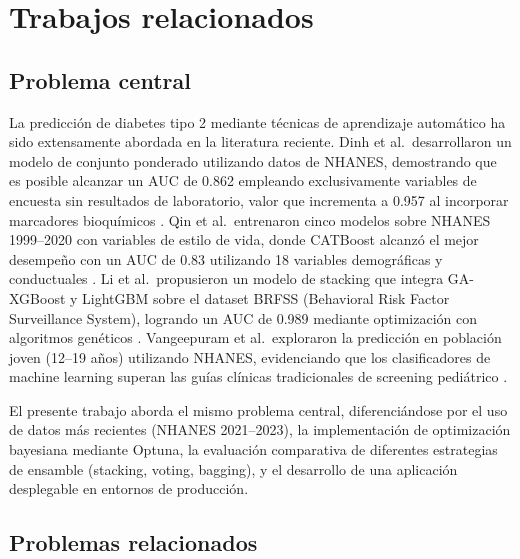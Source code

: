 \documentclass[12pt, a4paper]{report}
\begin{document}

\chapter{Trabajos relacionados}

\section{Problema central}

La predicción de diabetes tipo 2 mediante técnicas de aprendizaje automático ha sido extensamente abordada en la literatura reciente. Dinh et al.\ desarrollaron un modelo de conjunto ponderado utilizando datos de NHANES, demostrando que es posible alcanzar un AUC de 0.862 empleando exclusivamente variables de encuesta sin resultados de laboratorio, valor que incrementa a 0.957 al incorporar marcadores bioquímicos \citep{dinh2019data}. Qin et al.\ entrenaron cinco modelos sobre NHANES 1999--2020 con variables de estilo de vida, donde CATBoost alcanzó el mejor desempeño con un AUC de 0.83 utilizando 18 variables demográficas y conductuales \citep{qin2022machine}. Li et al.\ propusieron un modelo de stacking que integra GA-XGBoost y LightGBM sobre el dataset BRFSS (Behavioral Risk Factor Surveillance System), logrando un AUC de 0.989 mediante optimización con algoritmos genéticos \citep{li2024diabetes}. Vangeepuram et al.\ exploraron la predicción en población joven (12--19 años) utilizando NHANES, evidenciando que los clasificadores de machine learning superan las guías clínicas tradicionales de screening pediátrico \citep{vangeepuram2021predicting}.

El presente trabajo aborda el mismo problema central, diferenciándose por el uso de datos más recientes (NHANES 2021--2023), la implementación de optimización bayesiana mediante Optuna, la evaluación comparativa de diferentes estrategias de ensamble (stacking, voting, bagging), y el desarrollo de una aplicación desplegable en entornos de producción.

\section{Problemas relacionados}
\end{document}
